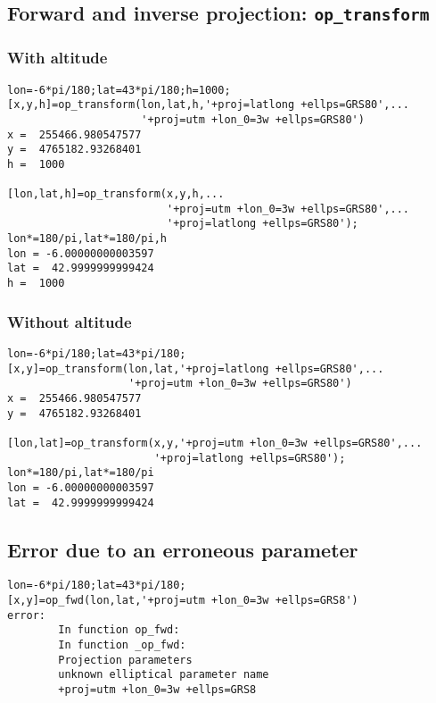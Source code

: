 \documentclass[10pt,a4paper]{article}
\begin{document}
\subsection{Forward and inverse projection: \texttt{op\_transform}}

\subsubsection{With altitude}

\begin{verbatim}
lon=-6*pi/180;lat=43*pi/180;h=1000;
[x,y,h]=op_transform(lon,lat,h,'+proj=latlong +ellps=GRS80',...
                     '+proj=utm +lon_0=3w +ellps=GRS80')
x =  255466.980547577
y =  4765182.93268401
h =  1000

[lon,lat,h]=op_transform(x,y,h,...
                         '+proj=utm +lon_0=3w +ellps=GRS80',...
                         '+proj=latlong +ellps=GRS80');
lon*=180/pi,lat*=180/pi,h
lon = -6.00000000003597
lat =  42.9999999999424
h =  1000
\end{verbatim}

\subsubsection{Without altitude}

\begin{verbatim}
lon=-6*pi/180;lat=43*pi/180;
[x,y]=op_transform(lon,lat,'+proj=latlong +ellps=GRS80',...
                   '+proj=utm +lon_0=3w +ellps=GRS80')
x =  255466.980547577
y =  4765182.93268401

[lon,lat]=op_transform(x,y,'+proj=utm +lon_0=3w +ellps=GRS80',...
                       '+proj=latlong +ellps=GRS80');
lon*=180/pi,lat*=180/pi
lon = -6.00000000003597
lat =  42.9999999999424
\end{verbatim}

\subsection{Error due to an erroneous parameter}

\begin{verbatim}
lon=-6*pi/180;lat=43*pi/180;
[x,y]=op_fwd(lon,lat,'+proj=utm +lon_0=3w +ellps=GRS8')
error:
        In function op_fwd:
        In function _op_fwd:
        Projection parameters
        unknown elliptical parameter name
        +proj=utm +lon_0=3w +ellps=GRS8
\end{verbatim}
\end{document}
